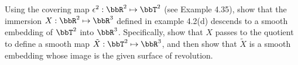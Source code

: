 Using the covering map $\epsilon^2:\bbR^2\mapsto\bbT^2$ (see Example 4.35), show that the immersion $X:\bbR^2\mapsto\bbR^3$ defined in example 4.2(d) descends to a smooth embedding of $\bbT^2$ into $\bbR^3$.  Specifically, show that $X$ passes to the quotient to define a smooth map $\tilde{X}:\bbT^2\mapsto\bbR^3$, and then show that $\tilde{X}$ is a smooth embedding whose image is the given surface of revolution.